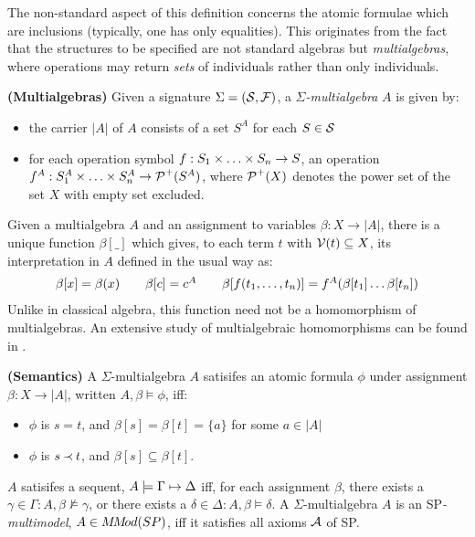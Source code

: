 The non-standard aspect of this definition concerns the atomic formulae which are
inclusions (typically, one has only equalities). This originates from the fact that
the structures to be specified are not standard algebras but {\em multialgebras},
where operations may return {\em sets} of individuals rather than only individuals.
%
\begin{DEFINITION} {\bf (Multialgebras)} \label{de:multialgebras}
Given a signature $\Sigma=(\Sorts,\Funcs)$, a {\em $\Sigma$-multialgebra} $A$
is given by:
\begin{itemize}\MyLPar
\item  the carrier $|A|$ of $A$ consists of a set $S^A$ for each $S\in\Sorts$
\item for each operation symbol $f: \List Sn\times \rightarrow S$, an operation
$f^A: \List {S^A}n\times \rightarrow \C P^+(S^A)$, where $\C P^+(X)$ denotes the 
power set of the set $X$ with empty set excluded.
\end{itemize}
\end{DEFINITION}
\noindent
Given a multialgebra $A$ and an assignment to variables $\beta:X\rightarrow |A|$, 
there is a unique function $\beta [\_]$ which gives, to each term $t$ 
with $\C V(t)\subseteq X$, its interpretation in $A$ defined in the usual way as:
\[ \begin{array}{ccccc} 
\beta [x] = \beta (x) & & \beta [c] = c^A
& & \beta [f(\List tn,)] = f^A(\beta[t_1]\ldots \beta[t_n]) 
\end{array} \]
Unlike in classical algebra, this function need not be a homomorphism of multialgebras.
An extensive study of multialgebraic homomorphisms can be found in \cite{WB}.
%
\begin{DEFINITION} {\bf (Semantics)} \label{de:semantics}
A $\Sigma$-multialgebra $A$ satisifes an atomic formula $\phi$ under assignment
 $\beta:X\rightarrow |A|$, written $A,\beta\models \phi$, iff:
\begin{itemize}\MyLPar
\item $\phi$ is $s=t$, and $\beta[s]=\beta[t]=\{a\}$ for some $a\in |A|$
\item $\phi$ is $s\Incl t$, and $\beta[s]\subseteq\beta[t]$.
\end{itemize}
 $A$ satisifes a sequent, $A\models\Gamma\Seq\Delta$ iff,
for each assignment $\beta$, there exists a $\gamma\in\Gamma : A,\beta\not\models
\gamma$, or there exists a $\delta\in\Delta: A,\beta\models \delta$. 
A $\Sigma$-multialgebra $A$ is an SP{\em-multimodel}, $A\in \MMod(SP)$, iff it satisfies 
all axioms $\Ax$ of SP.
\end{DEFINITION}
